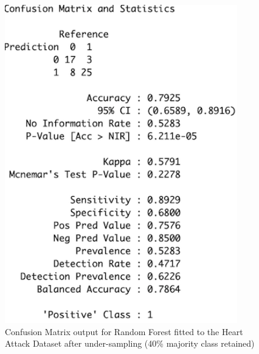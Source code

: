 \begin{figure}[!htbp]
\begin{minipage}{0.45\textwidth}
        \includegraphics[width=0.9\textwidth]{ThesisTemplate/appendix/images/Chapter5Appendix/ConfusionMatrix40/HA.png}
        \caption{Confusion Matrix output for Random Forest fitted to the Heart Attack Dataset after under-sampling (40\% majority class retained)}
        \label{fig:matrixHA40}
    \end{minipage}
\end{figure}


